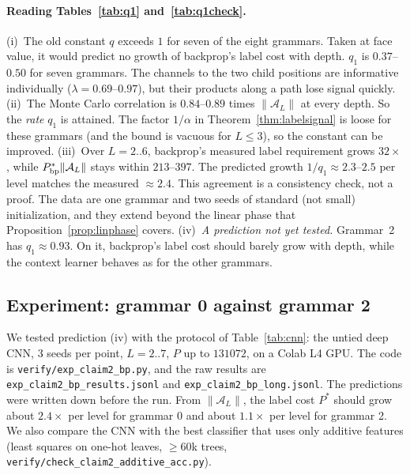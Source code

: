 \documentclass[11pt]{article}
\theoremstyle{definition}
\newcommand{\norm}[1]{\lVert #1\rVert}
\begin{document}
\paragraph{Reading Tables~\ref{tab:q1} and~\ref{tab:q1check}.}
(i)~The old constant $q$ exceeds $1$ for seven of the eight grammars. Taken at face value, it would
predict no growth of backprop's label cost with depth. $q_1$ is $0.37$--$0.50$ for seven grammars. The
channels to the two child positions are informative individually ($\lambda=0.69$--$0.97$), but their
products along a path lose signal quickly.
(ii)~The Monte Carlo correlation is $0.84$--$0.89$ times $\norm{\mathcal A_L}$ at every depth. So the
\emph{rate} $q_1$ is attained. The factor $1/\alpha$ in Theorem~\ref{thm:labelsignal} is loose for these
grammars (and the bound is vacuous for $L\le3$), so the constant can be improved.
(iii)~Over $L=2..6$, backprop's measured label requirement grows $32\times$, while
$P^*_{\rm bp}\norm{\mathcal A_L}$ stays within $213$--$397$. The predicted growth $1/q_1\approx2.3$--$2.5$ per
level matches the measured $\approx2.4$. This agreement is a consistency check, not a proof. The data
are one grammar and two seeds of standard (not small) initialization, and they extend beyond the
linear phase that Proposition~\ref{prop:linphase} covers.
(iv)~\emph{A prediction not yet tested.} Grammar~2 has $q_1\approx0.93$. On it, backprop's label cost
should barely grow with depth, while the context learner behaves as for the other grammars.

\subsection{Experiment: grammar 0 against grammar 2}\label{sec:claim2exp}
We tested prediction (iv) with the protocol of Table~\ref{tab:cnn}: the untied deep CNN, 3 seeds
per point, $L=2..7$, $P$ up to $131072$, on a Colab L4 GPU. The code is
\texttt{verify/exp\_claim2\_bp.py}, and the raw results are \texttt{exp\_claim2\_bp\_results.jsonl} and
\texttt{exp\_claim2\_bp\_long.jsonl}. The predictions were written down before the run. From
$\norm{\mathcal A_L}$, the label cost $P^*$ should grow about $2.4\times$ per level for grammar 0 and about
$1.1\times$ per level for grammar 2. We also compare the CNN with the best classifier that uses only
additive features (least squares on one-hot leaves, $\ge60$k trees,
\texttt{verify/check\_claim2\_additive\_acc.py}).
\end{document}
